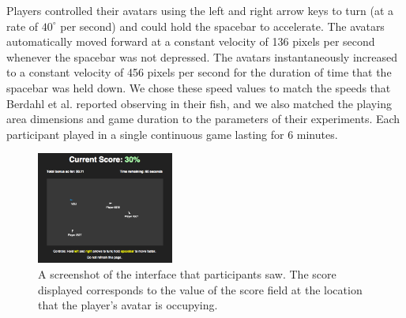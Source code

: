 \documentclass[12pt,letterpaper]{article}
\begin{document}
Players controlled their avatars using the left and right arrow keys
to turn (at a rate of $40^\circ$ per second) and could hold the
spacebar to accelerate.  The avatars automatically moved forward at a
constant velocity of 136 pixels per second whenever the spacebar was
not depressed.  The avatars instantaneously increased to a constant
velocity of 456 pixels per second for the duration of time that the
spacebar was held down.  We chose these speed values to match the
speeds that Berdahl et al. reported observing in their fish, and we
also matched the playing area dimensions and game duration to the
parameters of their experiments.  Each participant played in a single
continuous game lasting for 6 minutes.

\begin{figure}
  \centering
  \includegraphics[width=0.4\textwidth]{./figures/interface}
  \caption{A screenshot of the interface that participants saw.  The
    score displayed corresponds to the value of the score field at the
    location that the player's avatar is occupying.}
  \label{fig:interface}
\end{figure}
\end{document}
